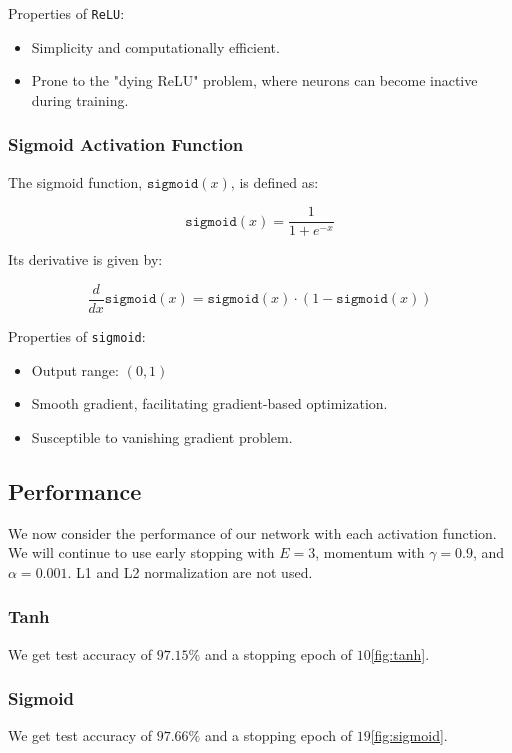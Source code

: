 Properties of \texttt{ReLU}:
\begin{itemize}
	\item Simplicity and computationally efficient.
	\item Prone to the "dying ReLU" problem, where neurons can become inactive during training.
\end{itemize}

\subsubsection{Sigmoid Activation Function}

The sigmoid function, \(\texttt{sigmoid}(x)\), is defined as:

\[
	\texttt{sigmoid}(x) = \frac{1}{1 + e^{-x}}
\]

Its derivative is given by:

\[
	\frac{d}{dx} \texttt{sigmoid}(x) = \texttt{sigmoid}(x) \cdot (1 - \texttt{sigmoid}(x))
\]

Properties of \texttt{sigmoid}:
\begin{itemize}
	\item Output range: \((0, 1)\)
	\item Smooth gradient, facilitating gradient-based optimization.
	\item Susceptible to vanishing gradient problem.
\end{itemize}

\subsection{Performance}

We now consider the performance of our network with each activation function. We will
continue to use early stopping with $E = 3$, momentum with $\gamma = 0.9$, and $\alpha = 0.001$.
L1 and L2 normalization are not used.

\subsubsection{Tanh}

We get test accuracy of $97.15\%$ and a stopping epoch of $10$\cref{fig:tanh}.

\subsubsection{Sigmoid}


We get test accuracy of $97.66\%$ and a stopping epoch of $19$\cref{fig:sigmoid}.

